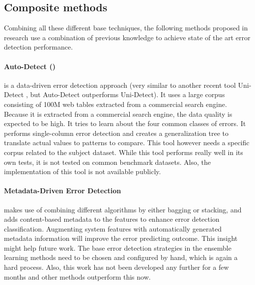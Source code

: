 
\subsection{Composite methods}
Combining all these different base techniques, the following methods proposed in research use a combination of previous knowledge to achieve state of the art error detection performance. 

\paragraph{Auto-Detect (\cite{Wang2019-jg})} is a data-driven error detection approach (very similar to another recent tool Uni-Detect \cite{Huang2018-er}, but Auto-Detect outperforms Uni-Detect). It uses a large corpus consisting of 100M web tables extracted from a commercial search engine. Because it is extracted from a commercial search engine, the data quality is expected to be high. It tries to learn about the four common classes of errors. It performs single-column error detection and creates a generalization tree to translate actual values to patterns to compare. This tool however needs a specific corpus related to the subject dataset. While this tool performs really well in its own tests, it is not tested on common benchmark datasets. Also, the implementation of this tool is not available publicly.

\paragraph{Metadata-Driven Error Detection \cite{Visengeriyeva2018-qz}} makes use of combining different algorithms by either bagging or stacking, and adds content-based metadata to the features to enhance error detection classification. Augmenting system features with automatically generated metadata information will improve the error predicting outcome. This insight might help future work. The base error detection strategies in the ensemble learning methods need to be chosen and configured by hand, which is again a hard process. Also, this work has not been developed any further for a few months and other methods outperform this now.

